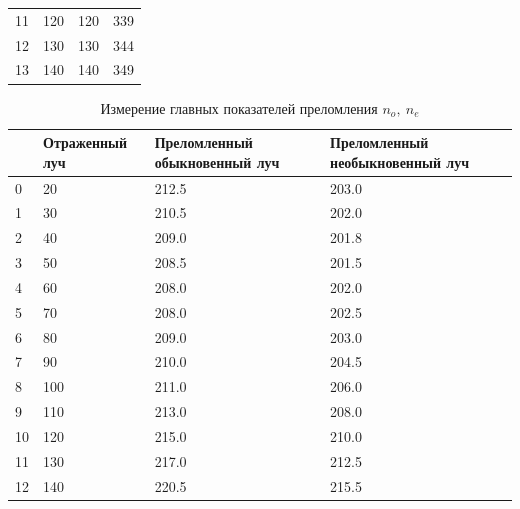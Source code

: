 \documentclass[12pt]{article}
\begin{document}
\begin{table}[h]
\begin{tabular}{|p{0.5cm}|p{3cm}|p{4cm}|p{4cm}|}
            11 & 120                               & 120                                              & 339                                         \\
            12 & 130                               & 130                                              & 344                                         \\
            13 & 140                               & 140                                              & 349                                         \\\hline
        \end{tabular}
    \end{table}

    \begin{table}
        \centering
        \caption{Измерение главных показателей преломления $n_o,\ n_e$}
        \label{tab:tab2}
        \begin{tabular}{|p{0.5cm}|p{3cm}|p{4cm}|p{4cm}|}
            \hline
            {} & Отраженный луч & Преломленный обыкновенный луч & Преломленный необыкновенный луч \\\hline
            0  & 20             & 212.5                         & 203.0                           \\
            1  & 30             & 210.5                         & 202.0                           \\
            2  & 40             & 209.0                         & 201.8                           \\
            3  & 50             & 208.5                         & 201.5                           \\
            4  & 60             & 208.0                         & 202.0                           \\
            5  & 70             & 208.0                         & 202.5                           \\
            6  & 80             & 209.0                         & 203.0                           \\
            7  & 90             & 210.0                         & 204.5                           \\
            8  & 100            & 211.0                         & 206.0                           \\
            9  & 110            & 213.0                         & 208.0                           \\
            10 & 120            & 215.0                         & 210.0                           \\
            11 & 130            & 217.0                         & 212.5                           \\
            12 & 140            & 220.5                         & 215.5                           \\\hline
        \end{tabular}
    \end{table}
\end{document}

